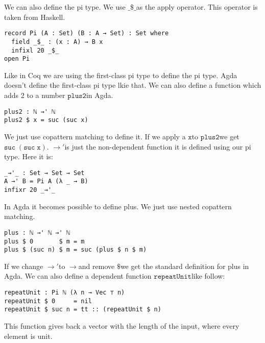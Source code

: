 \documentclass[a4paper,cleardoubleempty,BCOR1cm]{scrbook}
\begin{document}
We can also define the pi type.  We use $\mathtt{\_\$\_}$\;as the apply operator.  This
operator is taken from Haskell.

\begin{verbatim}
record Pi (A : Set) (B : A → Set) : Set where
  field _$_ : (x : A) → B x
  infixl 20 _$_
open Pi
\end{verbatim}

Like in Coq we are using the first-class pi type to define the pi type. Agda
doesn't define the first-class pi type lkie that.  We
can also define a function which adds 2 to a number $\mathtt{plus2}$\;in Agda.

\begin{verbatim}
plus2 : ℕ →' ℕ
plus2 $ x = suc (suc x)
\end{verbatim}

We just use copattern matching to define it. If we apply a $\mathtt{x}$\;to $\mathtt{plus2}$\;we
get \linebreak $\mathtt{suc\;(suc\;x)}$. $\mathtt{\rightarrow'}$\;is just the non-dependent function it is defined
using our pi type. Here it is:

\begin{verbatim}
_→'_ : Set → Set → Set
A →' B = Pi A (λ _ → B)
infixr 20 _→'_
\end{verbatim}

In Agda it becomes possible to define plus. We just use nested copattern
matching.

\begin{verbatim}
plus : ℕ →' ℕ →' ℕ
plus $ 0       $ m = m
plus $ (suc n) $ m = suc (plus $ n $ m)
\end{verbatim}

If we change $\mathtt{\rightarrow'}$\;to $\mathtt{\rightarrow}$\;and remove $\mathtt{\$}$\;we get the
standard definition for plus in Agda. We can also define a dependent function
$\mathtt{repeatUnit}$\;like follow:
\begin{verbatim}
repeatUnit : Pi ℕ (λ n → Vec ⊤ n)
repeatUnit $ 0     = nil
repeatUnit $ suc n = tt :: (repeatUnit $ n)
\end{verbatim}
This function gives back a vector with the length of the input, where every element
is unit.
\end{document}
